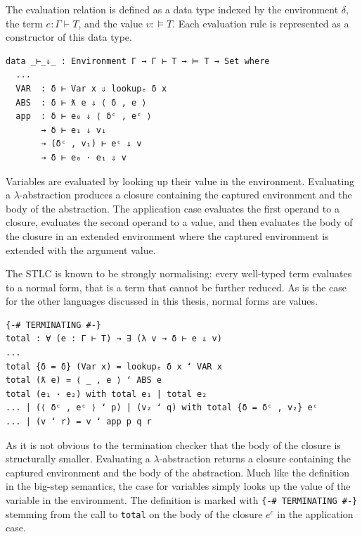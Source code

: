 

The evaluation relation is defined as a data type indexed by the environment $\delta$, the term $e : \Gamma \vdash T$, and the value $v : \vDash T$.
Each evaluation rule is represented as a constructor of this data type.

\begin{verbatim}
data _⊢_⇓_ : Environment Γ → Γ ⊢ T → ⊨ T → Set where
  ...
  VAR  : δ ⊢ Var x ⇓ lookupₑ δ x
  ABS  : δ ⊢ ƛ e ⇓ ⟨ δ , e ⟩
  app  : δ ⊢ e₀ ⇓ ⟨ δᶜ , eᶜ ⟩
       → δ ⊢ e₁ ⇓ v₁
       → (δᶜ , v₁) ⊢ eᶜ ⇓ v
       → δ ⊢ e₀ · e₁ ⇓ v
\end{verbatim}

Variables are evaluated by looking up their value in the environment. 
Evaluating a $\lambda$-abstraction produces a closure containing the captured environment and the body of the abstraction.
The application case evaluates the first operand to a closure, evaluates the second operand to a value, and then evaluates the body of the closure in an extended environment where the captured environment is extended with the argument value.


The STLC is known to be strongly normalising: every well-typed term evaluates to a normal form, that is a term that cannot be further reduced. As is the case for the other languages discussed in this thesis, normal forms are values.
\begin{verbatim}
{-# TERMINATING #-}
total : ∀ (e : Γ ⊢ T) → ∃ (λ v → δ ⊢ e ⇓ v)
...
total {δ = δ} (Var x) = lookupₑ δ x ʻ VAR x
total (ƛ e) = ⟨ _ , e ⟩ ʻ ABS e
total (e₁ · e₂) with total e₁ | total e₂
... | (⟨ δᶜ , eᶜ ⟩ ʻ p) | (v₂ ʻ q) with total {δ = δᶜ , v₂} eᶜ 
... | (v ʻ r) = v ʻ app p q r
\end{verbatim}

As it is not obvious to the termination checker that the body of the closure is structurally smaller.
Evaluating a $\lambda$-abstraction returns a closure containing the captured environment and the body of the abstraction.
Much like the definition in the big-step semantics, the case for variables simply looks up the value of the variable in the environment.
The definition is marked with \texttt{\{-\# TERMINATING \#-\}} stemming from the call to \texttt{total} on the body of the closure $e^c$ in the application case. 

